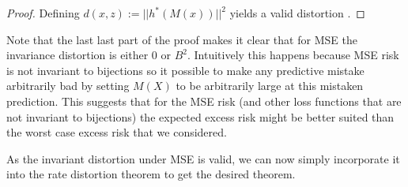 \documentclass[final]{article}
\begin{document}
\begin{proof}
	Defining $d(x,z) := || h^*(M(x)) ||^2$ yields a valid distortion \disttextinv{}.
\end{proof}

Note that the last last part of the proof makes it clear that for MSE the invariance distortion is either $0$ or $B^2$.
Intuitively this happens because MSE risk is not invariant to bijections so it possible to make any predictive mistake arbitrarily bad by setting $M(X)$ to be arbitrarily large at this mistaken prediction. 
This suggests that for the MSE risk (and other loss functions that are not invariant to bijections) the expected excess risk might be better suited than the worst case excess risk that we considered.


As the invariant distortion under MSE is valid, we can now simply incorporate it into the rate distortion theorem to get the desired theorem.
\end{document}
